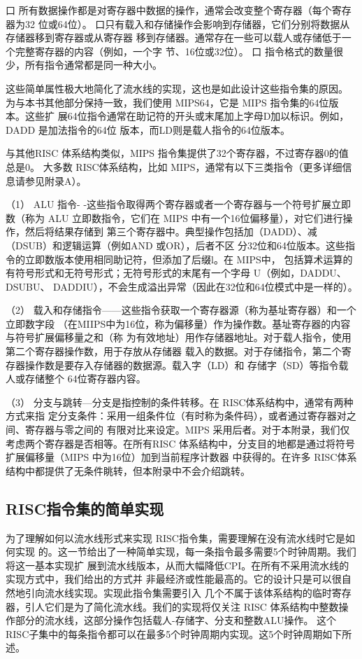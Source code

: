 口 所有数据操作都是对寄存器中数据的操作，通常会改变整个寄存器（每个寄存器为32
位或64位）。
口只有载入和存储操作会影响到存储器，它们分别将数据从存储器移到寄存器或从寄存器
移到存储器。通常存在一些可以载人或存储低于一个完整寄存器的内容（例如，一个字
节、16位或32位）。
口 指令格式的数量很少，所有指令通常都是同一种大小。

这些简单属性极大地简化了流水线的实现，这也是如此设计这些指令集的原因。
为与本书其他部分保持一致，我们使用 MIPS64，它是 MIPS 指令集的64位版本。这些扩
展64位指令通常在助记符的开头或末尾加上字母D加以标识。例如，DADD 是加法指令的64位
版本，而LD则是载人指令的64位版本。

与其他RISC 体系结构类似，MIPS 指令集提供了32个寄存器，不过寄存器0的值总是0。
大多数 RISC体系结构，比如 MIPS，通常有以下三类指令（更多详细信息请参见附录A）。

（1） ALU 指令-
-这些指令取得两个寄存器或者一个寄存器与一个符号扩展立即数（称为
ALU 立即数指令，它们在 MIPS 中有一个16位偏移量），对它们进行操作，然后将结果存储到
第三个寄存器中。典型操作包括加（DADD）、减（DSUB）和逻辑运算（例如AND 或OR），后者不区
分32位和64位版本。这些指令的立即数版本使用相同助记符，但添加了后缀l。在 MIPS中，
包括算术运算的有符号形式和无符号形式；无符号形式的末尾有一个字母 U（例如，DADDU、DSUBU、
DADDIU），不会生成溢出异常（因此在32位和64位模式中是一样的）。

（2） 载入和存储指令——这些指令获取一个寄存器源（称为基址寄存器）和一个立即数字段
（在MIIPS中为16位，称为偏移量）作为操作数。基址寄存器的内容与符号扩展偏移量之和（称
为有效地址）用作存储器地址。对于载人指令，使用第二个寄存器操作数，用于存放从存储器
载入的数据。对于存储指令，第二个寄存器操作数是要存入存储器的数据源。载入字（LD）和
存储字（SD）等指令载人或存储整个 64位寄存器内容。

（3） 分支与跳转—分支是指控制的条件转移。在 RISC体系结构中，通常有两种方式来指
定分支条件：采用一组条件位（有时称为条件码），或者通过寄存器对之间、寄存器与零之间的
有限对比来设定。MIPS 采用后者。对于本附录，我们仅考虑两个寄存器是否相等。在所有RISC
体系结构中，分支目的地都是通过将符号扩展偏移量（MIPS 中为16位）加到当前程序计数器
中获得的。在许多 RISC体系结构中都提供了无条件眺转，但本附录中不会介绍跳转。

\subsection{RISC指令集的简单实现}

为了理解如何以流水线形式来实现 RISC指令集，需要理解在没有流水线时它是如何实现
的。这一节给出了一种简单实现，每一条指令最多需要5个时钟周期。我们将这一基本实现扩
展到流水线版本，从而大幅降低CPI。在所有不采用流水线的实现方式中，我们给出的方式并
非最经济或性能最高的。它的设计只是可以很自然地引向流水线实现。实现此指令集需要引入
几个不属于该体系结构的临时寄存器，引人它们是为了简化流水线。我们的实现将仅关注 RISC
体系结构中整数操作部分的流水线，这部分操作包括载人-存储字、分支和整数ALU操作。
这个 RISC子集中的每条指令都可以在最多5个时钟周期内实现。这5个时钟周期如下所述。

